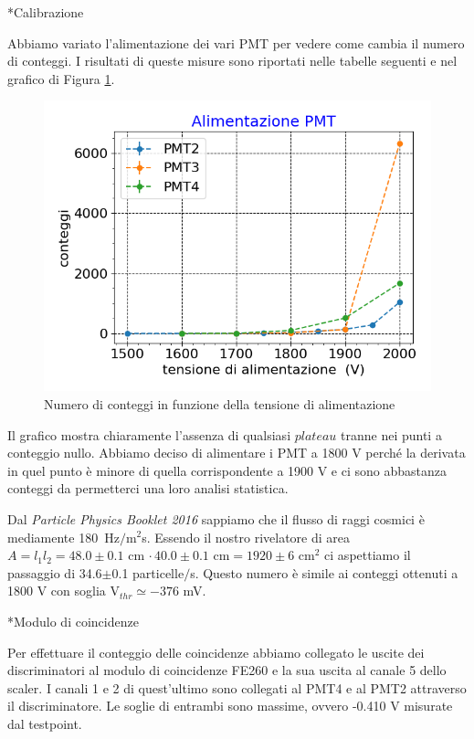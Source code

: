 \documentclass[12pt, a4paper]{article}
\author{ Marasciulli Andrea \qquad  Lorenzetti Giacomo \qquad Browne Roberto}
\date{\today}
\begin{document}
\begin{section}*{Calibrazione}

Abbiamo variato l'alimentazione dei vari PMT per vedere come cambia il numero di conteggi. I risultati di queste misure sono  riportati nelle tabelle seguenti e nel grafico di Figura \ref{tensio}. 

\begin{figure}[h]
\centering
\includegraphics[width=10 cm]{tensio_pmt}
\caption{Numero di conteggi in funzione della tensione di alimentazione}
\label{tensio}
\end{figure}

Il grafico mostra chiaramente l'assenza di qualsiasi $plateau$ tranne nei punti a conteggio nullo. Abbiamo deciso di alimentare i PMT a 1800\! V perché la derivata in quel punto è minore di quella corrispondente a 1900\! V e ci sono abbastanza conteggi da permetterci una loro analisi statistica.

Dal \emph{Particle Physics Booklet 2016} sappiamo che il flusso di raggi cosmici è mediamente 180~Hz$/$\!m$^2$s. Essendo il nostro rivelatore di area $A=l_1l_2=48.0\pm0.1$\! cm $\cdot \, 40.0\pm0.1$\! cm$=1920\pm6$\! cm$^2$ ci aspettiamo il passaggio di 34.6$\pm$0.1 particelle$/$s. Questo numero è simile ai conteggi ottenuti a 1800\! V con soglia V$_{thr}\simeq-376$\! mV. 

\end{section}


\begin{section}*{Modulo di coincidenze}

Per effettuare il conteggio delle coincidenze abbiamo collegato le uscite dei discriminatori al modulo di coincidenze FE260 e la sua uscita al canale 5 dello scaler. I canali 1 e 2 di quest'ultimo sono collegati al PMT4 e al PMT2 attraverso il discriminatore. Le soglie di entrambi sono massime, ovvero -0.410\! V misurate dal testpoint.

\end{section}
\end{document}
